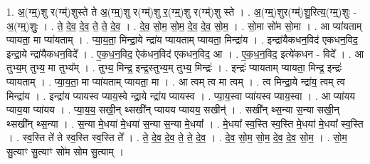 \documentclass[17pt]{extarticle}
\begin{document}
1. अ॒(ग्म्॒)शु र(ग्म्॑)शुस्ते ते अ॒(ग्म्॒)शु र(ग्म्॑)शु र॒(ग्म्॒)शु र(ग्म्॑)शु स्ते । . अ॒(ग्म्॒)शुर(ग्म्॑)शु॒रित्य॒(ग्म्॒)शुः - अ॒(ग्म्॒)शुः॒ । . ते॒ दे॒व॒ दे॒व॒ ते॒ ते॒ दे॒व॒ । . दे॒व॒ सो॒म॒ सो॒म॒ दे॒व॒ दे॒व॒ सो॒म॒ । . सो॒मा सो॑म सो॒मा । . आ प्या॑यताम् प्यायता॒ मा प्या॑यताम् । . प्या॒य॒ता॒ मिन्द्रा॒ये न्द्रा॑य प्यायताम् प्यायता॒ मिन्द्रा॑य । . इन्द्रा॑यैकधन॒विद॑ एकधन॒विद॒ इन्द्रा॒ये न्द्रा॑यैकधन॒विदे᳚ । . ए॒क॒ध॒न॒विद॒ ऐक॑धन॒विद॑ एकधन॒विद॒ आ । . ए॒क॒ध॒न॒विद॒ इत्ये॑कधन - विदे᳚ । . आ तुभ्य॒म् तुभ्य॒ मा तुभ्य᳚म् । . तुभ्य॒ मिन्द्र॒ इन्द्र॒स्तुभ्य॒म् तुभ्य॒ मिन्द्रः॑ । . इन्द्रः॑ प्यायताम् प्यायता॒ मिन्द्र॒ इन्द्रः॑ प्यायताम् । . प्या॒य॒ता॒ मा प्या॑यताम् प्यायता॒ मा । . आ त्वम् त्व मा त्वम् । . त्व मिन्द्रा॒ये न्द्रा॑य॒ त्वम् त्व मिन्द्रा॑य । . इन्द्रा॑य प्यायस्व प्याय॒स्वे न्द्रा॒ये न्द्रा॑य प्यायस्व । . प्या॒य॒स्वा प्या॑यस्व प्याय॒स्वा । . आ प्या॑यय प्याय॒या प्या॑यय । . प्या॒य॒य॒ सखी॒न् थ्सखी᳚न् प्यायय प्यायय॒ सखीन्॑ । . सखी᳚न् थ्स॒न्या स॒न्या सखी॒न् थ्सखी᳚न् थ्स॒न्या । . स॒न्या मे॒धया॑ मे॒धया॑ स॒न्या स॒न्या मे॒धया᳚ । . मे॒धया᳚ स्व॒स्ति स्व॒स्ति मे॒धया॑ मे॒धया᳚ स्व॒स्ति । . स्व॒स्ति ते॑ ते स्व॒स्ति स्व॒स्ति ते᳚ । . ते॒ दे॒व॒ दे॒व॒ ते॒ ते॒ दे॒व॒ । . दे॒व॒ सो॒म॒ सो॒म॒ दे॒व॒ दे॒व॒ सो॒म॒ । . सो॒म॒ सु॒त्याꣳ सु॒त्याꣳ सो॑म सोम सु॒त्याम् । \newline
\end{document}
